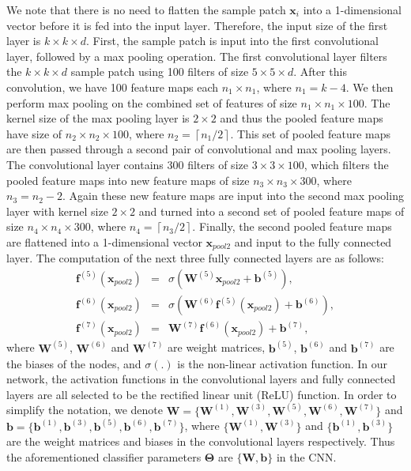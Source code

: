 \documentclass[journal]{IEEEtran}
\begin{document}
	We note that there is no need to flatten the sample patch $\mathbf{x}_{i}$ into a 1-dimensional vector before it is fed into the input layer. Therefore, the input size of the first layer is $k\times k\times d$. First, the sample patch is input into the first convolutional layer, followed by a max pooling operation. The first convolutional layer filters the  $k\times k\times d$ sample patch using 100 {{filters}} of size {{$5\times 5\times d$}}. After this convolution, we have 100 feature maps each $n_{1}\times n_{1}$, where $n_{1}=k-4$. We then perform max pooling on the combined set of features of size $n_1\times n_1\times 100$. The kernel size of the max pooling layer is $2\times 2$ and thus the pooled feature maps have size of $n_2\times n_2\times 100$, where $n_2=\left\lceil n_{1}/2\right\rceil$. This set of pooled feature maps are then passed through a second pair of convolutional and max pooling layers. The convolutional layer contains 300 {{filters}} of size {{$3\times 3\times 100$}}, which filters 
the pooled feature maps into new feature maps of size $n_3\times n_3\times 300$, where $n_{3}=n_2-2$. Again these new feature maps are input into the second max pooling 
	layer with kernel size $2\times 2$ and turned into a second set of pooled feature maps of size $n_4\times n_4\times 300$, where $n_{4}=\left\lceil n_{3}/2\right\rceil$. Finally, the second pooled feature maps are flattened into a 1-dimensional vector $\mathbf{x}_{pool2}$ and input to the fully connected layer. The computation of the next three fully connected layers are as follows: 
	\begin{eqnarray}
	\mathbf{f}^{(5)}(\mathbf{x}_{pool2}) &=& \sigma(\mathbf{W}^{(5)}\mathbf{x}_{pool2}+\mathbf{b}^{(5)}),\\
	\mathbf{f}^{(6)}(\mathbf{x}_{pool2}) &=& \sigma(\mathbf{W}^{(6)}\mathbf{f}^{(5)}(\mathbf{x}_{pool2})+\mathbf{b}^{(6)}),\\
	\mathbf{f}^{(7)}(\mathbf{x}_{pool2}) &=&\mathbf{W}^{(7)}\mathbf{f}^{(6)}(\mathbf{x}_{pool2})+\mathbf{b}^{(7)},
	\end{eqnarray}
	where $\mathbf{W}^{(5)}$, $\mathbf{W}^{(6)}$ and $\mathbf{W}^{(7)}$ are weight matrices, $\mathbf{b}^{(5)}$, $\mathbf{b}^{(6)}$ and $\mathbf{b}^{(7)}$ are the biases of the nodes, and $\sigma(.)$ is the non-linear activation function. In our network, the activation functions in the convolutional layers and fully connected layers are all selected to be the rectified linear unit (ReLU) function. In order to simplify the notation, we denote $\mathbf{W}=\{\mathbf{W}^{(1)},\mathbf{W}^{(3)},\mathbf{W}^{(5)},\mathbf{W}^{(6)},\mathbf{W}^{(7)}\}$ and $\mathbf{b}=\{\mathbf{b}^{(1)},\mathbf{b}^{(3)},\mathbf{b}^{(5)},\mathbf{b}^{(6)},\mathbf{b}^{(7)}\}$, where $\{\mathbf{W}^{(1)},\mathbf{W}^{(3)}\}$ and $\{\mathbf{b}^{(1)},\mathbf{b}^{(3)}\}$ are the weight matrices and biases in the convolutional layers respectively. {{Thus the aforementioned classifier parameters $\boldsymbol{\Theta}$ are $\{\mathbf{W},\mathbf{b}\}$ in the CNN.}}
	
\end{document}
